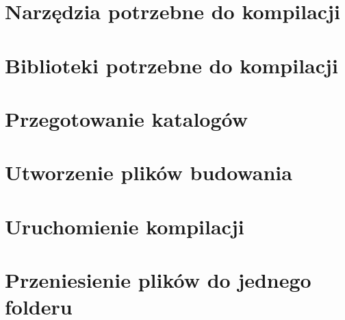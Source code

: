 
\section{Narzędzia potrzebne do kompilacji}

\section{Biblioteki potrzebne do kompilacji}

\section{Przegotowanie katalogów}

\section{Utworzenie plików budowania}

\section{Uruchomienie kompilacji}

\section{Przeniesienie plików do jednego folderu}